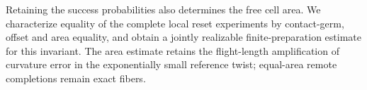 Retaining the success probabilities also determines the free cell area.
We characterize equality of the complete local reset experiments by
contact-germ, offset and area equality, and obtain a jointly realizable
finite-preparation estimate for this invariant.  The area estimate retains
the flight-length amplification of curvature error in the exponentially
small reference twist; equal-area remote completions remain exact fibers.
